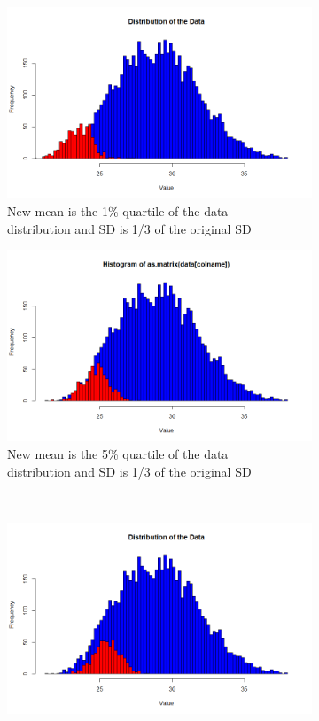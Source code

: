 \documentclass[10pt,a4paper]{article}
\begin{document}
\begin{enumerate}
\begin{figure}
	\begin{subfigure}{.5\textwidth}
		\centering
		\includegraphics[width=.8\linewidth]{img/mean1sd13}
		\caption{New mean is the 1\% quartile of the data \\ distribution and SD is 1/3 of the original SD}
		\label{fig:sfig1}
	\end{subfigure}%
	\begin{subfigure}{.5\textwidth}
		\centering
		\includegraphics[width=.8\linewidth]{img/mean5sd13}
		\caption{New mean is the 5\% quartile of the data \\ distribution and SD is 1/3 of the original SD}
		\label{fig:sfig2}
	\end{subfigure}\\
	\begin{subfigure}{.5\textwidth}
		\centering
		\includegraphics[width=.8\linewidth]{img/mean10sd13}

\end{subfigure}
\end{figure}
\end{enumerate}
\end{document}
